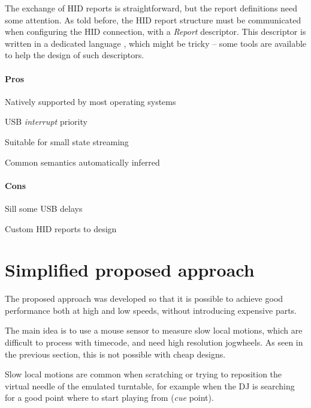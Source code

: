 \documentclass[a4paper,10pt]{article}
\begin{document}
\begin{multicols}{2}
The exchange of HID reports is straightforward, but the report definitions
need some attention. As told before, the HID report structure must be
communicated when configuring the HID connection, with a \emph{Report}
descriptor. This descriptor is written in a dedicated language
\cite{hid_docs}, which might be tricky -- some tools are available to help the
design of such descriptors.


\paragraph{Pros}
\begin{itemize*}
	\item Natively supported by most operating systems
	\item USB \emph{interrupt} priority
	\item Suitable for small state streaming
	\item Common semantics automatically inferred
\end{itemize*}


\paragraph{Cons}
\begin{itemize*}
	\item Sill some USB delays
	\item Custom HID reports to design
\end{itemize*}


\section{Simplified proposed approach}
\label{sec:simplified_approach}

The proposed approach was developed so that it is possible to achieve good
performance both at high and low speeds, without introducing expensive parts.

The main idea is to use a mouse sensor to measure slow local motions, which
are difficult to process with timecode, and need high resolution jogwheels.
As seen in the previous section, this is not possible with cheap designs.

Slow local motions are common when scratching or trying to reposition the
virtual needle of the emulated turntable, for example when the DJ is searching
for a good point where to start playing from (\emph{cue} point).


\end{multicols}
\end{document}
